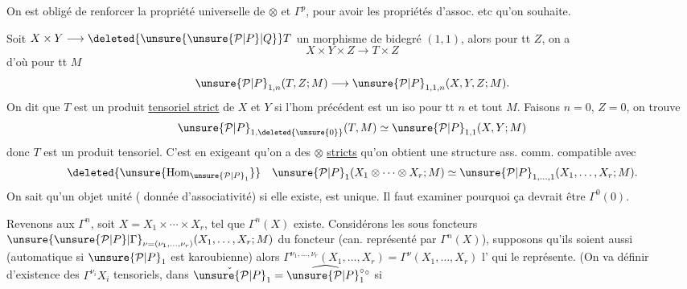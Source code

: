 On est obligé de renforcer la propriété universelle de $\otimes$ et $\Gamma^p$, pour avoir les propriétés d'assoc. etc qu'on souhaite.

Soit $X\times Y\longrightarrow\deleted{\unsure{\unsure{\mathcal P|P}|Q}}T$ un morphisme de bidegré $(1,1)$, alors pour tt $Z$, on a
\[
X\times Y\times Z\longrightarrow T\times Z
\]
d'où pour tt $M$
\[
\unsure{\mathcal P|P}_{1,n}(T,Z;M)\longrightarrow \unsure{\mathcal P|P}_{1,1,n}(X,Y,Z;M).
\]
On dit que $T$ est un produit \uline{tensoriel strict} de $X$ et $Y$ si l'hom précédent est un iso  pour tt $n$ et tout $M$. Faisons $n=0$, $Z=0$, on trouve
\[
\unsure{\mathcal P|P}_{1,\deleted{\unsure{0}}}(T,M)\simeq \unsure{\mathcal P|P}_{1,1}(X,Y;M)
\]
donc $T$ est un produit tensoriel. C'est en exigeant qu'on a des $\otimes$ \uline{stricts}    qu'on obtient une structure  ass. comm. compatible avec
\[
\deleted{\unsure{\operatorname{Hom}_{\unsure{\mathcal P|P}_1}}}\quad \unsure{\mathcal P|P}_1(X_1\otimes\cdots\otimes X_r;M)\simeq \unsure{\mathcal P|P}_{1,\ldots,1}(X_1,\ldots,X_r;M).
\]
On sait qu'un objet unité ( donnée d'associativité) si elle existe, est unique.  Il faut examiner pourquoi ça devrait être $\Gamma^0(0)$.

Revenons aux $\Gamma^n$, soit $X=X_1\times\cdots\times X_r$, tel que $\Gamma^n(X)$ existe. Considérons les sous foncteurs $\unsure{\unsure{\mathcal P|P}|\Gamma}_{\nu=(\nu_1,\ldots,\nu_r)}(X_1,\ldots,X_r;M)$ du foncteur  (can. représenté par $\Gamma^n(X)$), supposons qu'ils soient aussi  (automatique si $\unsure{\mathcal P|P}_1$ est karoubienne) alors $\Gamma^{\nu_1,\ldots,\nu_r}(X_1,\ldots,X_r)=\Gamma^\nu(X_1,\ldots,X_r)$ l'  qui le représente. 
(On va définir  d'existence des $\Gamma^{\nu_i}X_i$   tensoriels,  dans $\check \unsure{\mathcal P|P}_1=\widehat{\unsure{\mathcal P|P}_1^\circ}{}^\circ$ si

